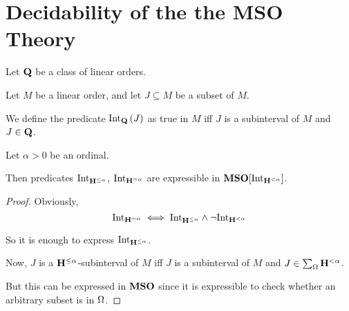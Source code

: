 \section{Decidability of the the MSO Theory}

\begin{definition}
  Let $\mathbf{Q}$ be a class of linear orders.

  Let $M$ be a linear order, and let $J \subseteq M$ be a subset of $M$.

  We define the predicate $\mathrm{Int}_{\mathbf{Q}} \left( {J} \right)$ as
  true in $M$ iff $J$ is a subinterval of $M$ and
  $J \in \mathbf{Q}$.
\end{definition}

\begin{lemma}
  Let $\alpha > 0$ be an ordinal.

  Then predicates $\mathrm{Int}_{\mathbf{H}^{\le \alpha}}$, $\mathrm{Int}_{\mathbf{H}^{= \alpha}}$
  are expressible in $\mathbf{MSO}[\mathrm{Int}_{\mathbf{H}^{< \alpha}}]$.
\end{lemma}

\begin{proof}
  Obviously, \[
    \mathrm{Int}_{\mathbf{H}^{= \alpha}}
    \iff \mathrm{Int}_{\mathbf{H}^{\le \alpha}} \wedge \neg \mathrm{Int}_{\mathbf{H}^{< \alpha}}
  \]

  So it is enough to express $\mathrm{Int}_{\mathbf{H}^{\le \alpha}}$.

  Now, $J$ is a $\mathbf{H}^{\le \alpha}$-subinterval of $M$ iff
  $J$ is a subinterval of $M$ and $J \in \sum_{\Omega}{\mathbf{H}^{< \alpha}}$.

  But this can be expressed in $\mathbf{MSO}$ since it is expressible
  to check whether an arbitrary subset is in $\Omega$.
\end{proof}

